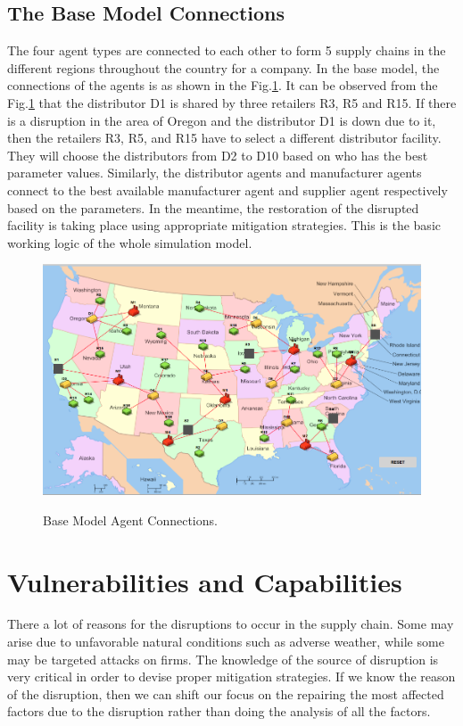 \subsection{The Base Model Connections}
The four agent types are connected to each other to form 5 supply chains in the different regions throughout the country for a company. In the base model, the connections of the agents is as shown in the Fig.\ref{Base}. It can be observed from the Fig.\ref{Base} that the distributor D1 is shared by three retailers R3, R5 and R15. If there is a disruption in the area of Oregon and the distributor D1 is down due to it, then the retailers R3, R5, and R15 have to select a different distributor facility. They will choose the distributors from D2 to D10 based on who has the best parameter values. Similarly, the distributor agents and manufacturer agents connect to the best available manufacturer agent and supplier agent respectively based on the parameters. In the meantime, the restoration of the disrupted facility is taking place using appropriate mitigation strategies. This is the basic working logic of the whole simulation model.

\begin{figure}[H]
  \centering
  \includegraphics[width=6.5in]{figures/pdf/Basic-connections.png}\\
  \caption{Base Model Agent Connections.}\label{Base}
\end{figure}

\newpage
\section{Vulnerabilities and Capabilities}

There a lot of reasons for the disruptions to occur in the supply chain. Some may arise due to unfavorable natural conditions such as adverse weather, while some may be targeted attacks on firms. The knowledge of the source of disruption is very critical in order to devise proper mitigation strategies. If we know the reason of the disruption, then we can shift our focus on the repairing the most affected factors due to the disruption rather than doing the analysis of all the factors.

